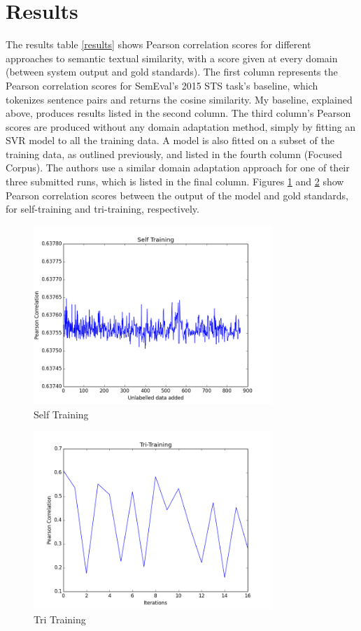 \documentclass[11pt]{article}
\begin{document}
\section{Results}
The results table \ref{results} shows Pearson correlation scores for different approaches to semantic textual similarity, with a score given at every domain (between system output and gold standards). The first column represents the Pearson correlation scores for SemEval's 2015 STS task's baseline, which tokenizes sentence pairs and returns the cosine similarity. My baseline, explained above, produces results listed in the second column. The third column's Pearson scores are produced without any domain adaptation method, simply by fitting an SVR model to all the training data. A model is also fitted on a subset of the training data, as outlined previously, and listed in the fourth column (Focused Corpus). The authors use a similar domain adaptation approach for one of their three submitted runs, which is listed in the final column. Figures \ref{fig:selftraining} and \ref{fig:tritraining} show Pearson correlation scores between the output of the model and gold standards, for self-training and tri-training, respectively. \\
\begin{figure}[h]
\includegraphics[width=9cm]{selftraining}
\caption{Self Training}
\label{fig:selftraining}
\end{figure}

\begin{figure}[h]
\includegraphics[width=9cm]{tritraining}
\caption{Tri Training}
\label{fig:tritraining}
\end{figure}
\end{document}
